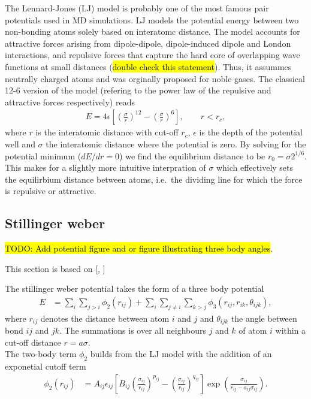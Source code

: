 The Lennard-Jones (LJ) model is probably one of the most famous pair potentials
used in MD simulations. LJ models the potential energy between two non-bonding
atoms solely based on interatomc distance. The model accounts for attractive
forces arising from dipole-dipole, dipole-induced dipole and London
interactions, and repulsive forces that capture the hard core of overlapping wave functions at small distances (\hl{double check this statement}). Thus, it assummes
neutrally charged atoms and was orginally proposed for noble gases. The
classical 12-6 version of the model (refering to the power law of the repulsive
and attractive forces respectively) reads
\begin{align}
  E = 4\epsilon \left[\left(\frac{\sigma}{r}\right)^{12} - \left(\frac{\sigma}{r}\right)^6 \right ], \qquad r < r_c,
  \label{eq:LJ}
\end{align}
where $r$ is the interatomic distance with cut-off $r_c$, $\epsilon$ is the
depth of the potential well and $\sigma$ the interatomic distance where the potential is
zero. By solving for the potential minimum ($dE/dr = 0$) we find the equilibrium
distance to be $r_0 = \sigma 2^{1/6}$. This makes for a slightly more intuitive
interpration of $\sigma$ which effectively sets the equilirbium distance between
atoms, i.e.\ the dividing line for which the force is repulsive or
attractive. 




\subsection{Stillinger weber}
\hl{TODO: Add potential figure and or figure illustrating three body angles}.

This section is based on [\cite{docs_lammps_sw}, \cite{PhysRevB.31.5262}]

The stillinger weber potential takes the form of a three body potential
\begin{align*}
  E &=\sum_i \sum_{j>i} \phi_2(r_{i j})+\sum_i \sum_{j \neq i} \sum_{k>j} \phi_3(r_{ij}, r_{ik}, \theta_{ijk}),
\end{align*}
where $r_{ij}$ denotes the distance between atom $i$ and $j$ and $\theta_{ijk}$
the angle between bond $ij$ and $jk$. The summations is over all neighbours $j$
and $k$ of atom $i$ within a cut-off distance $r = a\sigma$. \\
The two-body term $\phi_2$ builds from the LJ model with the addition of an
exponetial cutoff term
\begin{align}
  \phi_2(r_{i j}) & =A_{ij} \epsilon_{ij}\left[B_{ij}\left(\frac{\sigma_{ij}}{r_{ij}}\right)^{p_{ij}} - \left(\frac{\sigma_{ij}}{r_{ij}}\right)^{q_{ij}}\right] \exp (\frac{\sigma_{ij}}{r_{ij}-a_{ij} \sigma_{ij}}).
  \label{eq:sw_2}
\end{align}

